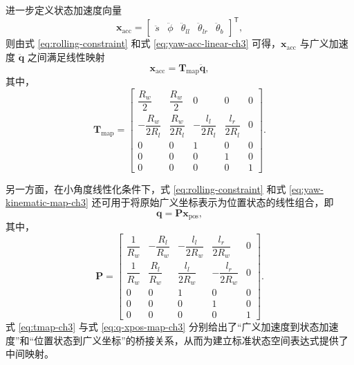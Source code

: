 进一步定义状态加速度向量
\begin{equation}
  \boldsymbol{x}_{\mathrm{acc}}
  =
  \begin{bmatrix}
    \ddot{s} & \ddot{\phi} & \ddot{\theta}_{ll} & \ddot{\theta}_{lr} & \ddot{\theta}_b
  \end{bmatrix}^{\mathsf{T}},
  \label{eq:xacc-ch3}
\end{equation}
则由式 \eqref{eq:rolling-constraint} 和式 \eqref{eq:yaw-acc-linear-ch3} 可得，$\boldsymbol{x}_{\mathrm{acc}}$ 与广义加速度 $\ddot{\boldsymbol{q}}$ 之间满足线性映射
\begin{equation}
  \boldsymbol{x}_{\mathrm{acc}} = \boldsymbol{T}_{\mathrm{map}}\ddot{\boldsymbol{q}},
  \label{eq:tmap-def-ch3}
\end{equation}
其中，
\begin{equation}
  \boldsymbol{T}_{\mathrm{map}}
  =
  \begin{bmatrix}
    \dfrac{R_w}{2} & \dfrac{R_w}{2} & 0 & 0 & 0 \\
    -\dfrac{R_w}{2R_l} & \dfrac{R_w}{2R_l} & -\dfrac{l_l}{2R_l} & \dfrac{l_r}{2R_l} & 0 \\
    0 & 0 & 1 & 0 & 0 \\
    0 & 0 & 0 & 1 & 0 \\
    0 & 0 & 0 & 0 & 1
  \end{bmatrix}.
  \label{eq:tmap-ch3}
\end{equation}

另一方面，在小角度线性化条件下，式 \eqref{eq:rolling-constraint} 和式 \eqref{eq:yaw-kinematic-map-ch3} 还可用于将原始广义坐标表示为位置状态的线性组合，即
\begin{equation}
  \boldsymbol{q}
  =
  \boldsymbol{P}\boldsymbol{x}_{\mathrm{pos}},
  \label{eq:q-xpos-map-def-ch3}
\end{equation}
其中，
\begin{equation}
  \boldsymbol{P}
  =
  \begin{bmatrix}
    \dfrac{1}{R_w} & -\dfrac{R_l}{R_w} & -\dfrac{l_l}{2R_w} & \dfrac{l_r}{2R_w} & 0 \\
    \dfrac{1}{R_w} & \dfrac{R_l}{R_w} & \dfrac{l_l}{2R_w} & -\dfrac{l_r}{2R_w} & 0 \\
    0 & 0 & 1 & 0 & 0 \\
    0 & 0 & 0 & 1 & 0 \\
    0 & 0 & 0 & 0 & 1
  \end{bmatrix}.
  \label{eq:q-xpos-map-ch3}
\end{equation}
式 \eqref{eq:tmap-ch3} 与式 \eqref{eq:q-xpos-map-ch3} 分别给出了“广义加速度到状态加速度”和“位置状态到广义坐标”的桥接关系，从而为建立标准状态空间表达式提供了中间映射。

